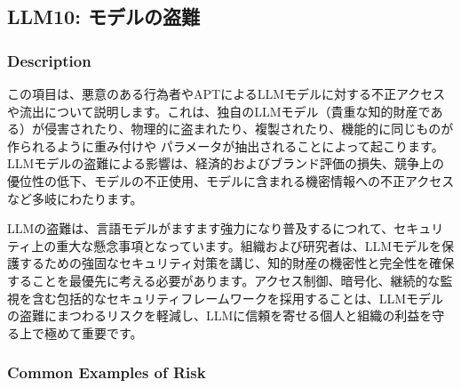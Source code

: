 \documentclass[
]{article}
\author{}
\date{}
\begin{document}
\subsection{LLM10:
モデルの盗難}\label{llm10-ux30e2ux30c7ux30ebux306eux76d7ux96e3}

\subsubsection{Description}\label{description}

この項目は、悪意のある行為者やAPTによるLLMモデルに対する不正アクセスや流出について説明します。これは、独自のLLMモデル（貴重な知的財産である）が侵害されたり、物理的に盗まれたり、複製されたり、機能的に同じものが作られるように重み付けや
パラメータが抽出されることによって起こります。LLMモデルの盗難による影響は、経済的およびブランド評価の損失、競争上の優位性の低下、モデルの不正使用、モデルに含まれる機密情報への不正アクセスなど多岐にわたります。

LLMの盗難は、言語モデルがますます強力になり普及するにつれて、セキュリティ上の重大な懸念事項となっています。組織および研究者は、LLMモデルを保護するための強固なセキュリティ対策を講じ、知的財産の機密性と完全性を確保することを最優先に考える必要があります。アクセス制御、暗号化、継続的な監視を含む包括的なセキュリティフレームワークを採用することは、LLMモデルの盗難にまつわるリスクを軽減し、LLMに信頼を寄せる個人と組織の利益を守る上で極めて重要です。

\subsubsection{Common Examples of Risk}\label{common-examples-of-risk}
\end{document}
